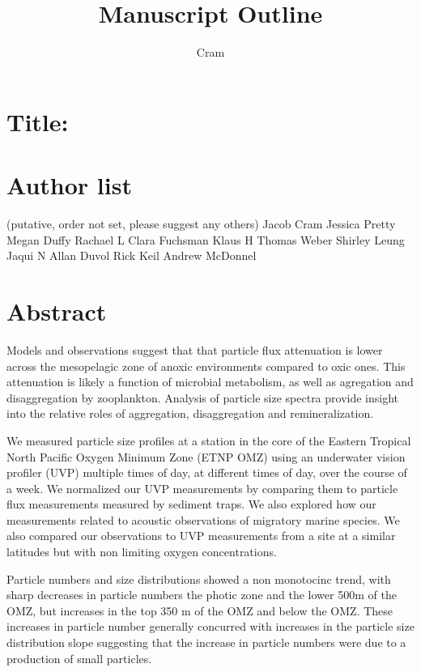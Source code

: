 \documentclass[]{article}
\title{Manuscript Outline}
\author{Cram}
\date{}
\begin{document}
\maketitle

\hypertarget{title}{%
\section{Title:}\label{title}}

\hypertarget{author-list}{%
\section{Author list}\label{author-list}}

(putative, order not set, please suggest any others) Jacob Cram Jessica
Pretty Megan Duffy Rachael L Clara Fuchsman Klaus H Thomas Weber Shirley
Leung Jaqui N Allan Duvol Rick Keil Andrew McDonnel

\hypertarget{abstract}{%
\section{Abstract}\label{abstract}}

Models and observations suggest that that particle flux attenuation is
lower across the mesopelagic zone of anoxic environments compared to
oxic ones. This attenuation is likely a function of microbial
metabolism, as well as agregation and disaggregation by zooplankton.
Analysis of particle size spectra provide insight into the relative
roles of aggregation, disaggregation and remineralization.

We measured particle size profiles at a station in the core of the
Eastern Tropical North Pacific Oxygen Minimum Zone (ETNP OMZ) using an
underwater vision profiler (UVP) multiple times of day, at different
times of day, over the course of a week. We normalized our UVP
measurements by comparing them to particle flux measurements measured by
sediment traps. We also explored how our measurements related to
acoustic observations of migratory marine species. We also compared our
observations to UVP measurements from a site at a similar latitudes but
with non limiting oxygen concentrations.

Particle numbers and size distributions showed a non monotocinc trend,
with sharp decreases in particle numbers the photic zone and the lower
500m of the OMZ, but increases in the top 350 m of the OMZ and below the
OMZ. These increases in particle number generally concurred with
increases in the particle size distribution slope suggesting that the
increase in particle numbers were due to a production of small
particles.
\end{document}
